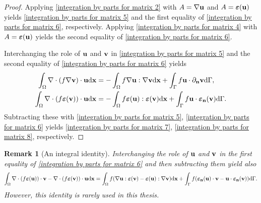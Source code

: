 \documentclass[oneside,11pt]{book}
\numberwithin{equation}{section}
\newtheorem{remark}{Remark}[section]
\begin{document}
\begin{proof}
    Applying \eqref{integration by parts for matrix 2} with $A = \nabla{\bf u}$ and $A = \boldsymbol{\varepsilon}({\bf u})$ yields \eqref{integration by parts for matrix 5} and the first equality of \eqref{integration by parts for matrix 6}, respectively. Applying \eqref{integration by parts for matrix 4} with $A = \boldsymbol{\varepsilon}({\bf u})$ yields the second equality of \eqref{integration by parts for matrix 6}.
    
    Interchanging the role of ${\bf u}$ and ${\bf v}$ in \eqref{integration by parts for matrix 5} and the second equality of \eqref{integration by parts for matrix 6} yields
    \begin{align*}
        \int_\Omega \nabla\cdot(f\nabla{\bf v})\cdot{\bf u}{\rm d}{\bf x} &= -\int_\Omega f\nabla{\bf u}:\nabla{\bf v}{\rm d}{\bf x} + \int_\Gamma f{\bf u}\cdot\partial_{\bf n}{\bf v}{\rm d}\Gamma,\\
        \int_\Omega \nabla\cdot(f\boldsymbol{\varepsilon}({\bf v}))\cdot{\bf u}{\rm d}{\bf x} &= -\int_\Omega f\boldsymbol{\varepsilon}({\bf u}):\boldsymbol{\varepsilon}({\bf v}){\rm d}{\bf x} + \int_\Gamma f{\bf u}\cdot\boldsymbol{\varepsilon}_{\bf n}({\bf v}){\rm d}\Gamma.
    \end{align*}
    Subtracting these with \eqref{integration by parts for matrix 5}, \eqref{integration by parts for matrix 6} yields \eqref{integration by parts for matrix 7}, \eqref{integration by parts for matrix 8}, respectively.
\end{proof}

\begin{remark}[An integral identity]
    Interchanging the role of ${\bf u}$ and ${\bf v}$ in the first equality of \eqref{integration by parts for matrix 6} and then subtracting them yield also
    \begin{align*}
        \int_\Omega \nabla\cdot(f\boldsymbol{\varepsilon}({\bf u}))\cdot{\bf v} - \nabla\cdot(f\boldsymbol{\varepsilon}({\bf v}))\cdot{\bf u}{\rm d}{\bf x} = \int_\Omega f(\nabla{\bf u}:\boldsymbol{\varepsilon}({\bf v}) - \boldsymbol{\varepsilon}({\bf u}):\nabla{\bf v}){\rm d}{\bf x} + \int_\Gamma f(\boldsymbol{\varepsilon}_{\bf n}({\bf u})\cdot{\bf v} - {\bf u}\cdot\boldsymbol{\varepsilon}_{\bf n}({\bf v})){\rm d}\Gamma.
    \end{align*}
    However, this identity is rarely used in this thesis.
\end{remark}
\end{document}
